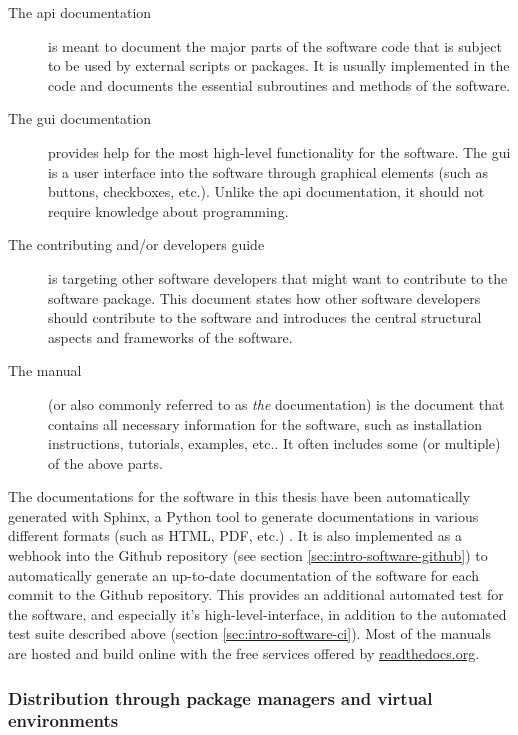 \begin{refsection}
\begin{description}
	\item[The \gls{api} documentation] is meant to document the major parts of the software code that is subject to be used by external scripts or packages. It is usually implemented in the code and documents the essential subroutines and methods of the software.
	\item[The \gls{gui} documentation] provides help for the most high-level functionality for the software. The \gls{gui} is a user interface into the software through graphical elements (such as buttons, checkboxes, etc.). Unlike the \gls{api} documentation, it should not require knowledge about programming.
	\item[The contributing and/or developers guide] is targeting other software developers that might want to contribute to the software package. This document states how other software developers should contribute to the software and introduces the central structural aspects and frameworks of the software.
	\item[The manual] (or also commonly referred to as \textit{the} documentation) is the document that contains all necessary information for the software, such as installation instructions, tutorials, examples, etc.. It often includes some (or multiple) of the above parts.
\end{description}

The documentations for the software in this thesis have been automatically generated with Sphinx, a Python tool to generate documentations in various different formats (such as HTML, PDF, etc.)  \citep{PerezGrangerHunter2011, Hasecke2019}. It is also implemented as a webhook into the Github repository (see section \ref{sec:intro-software-github}) to automatically generate an up-to-date documentation of the software for each commit to the Github repository. This provides an additional automated test for the software, and especially it's high-level-interface, in addition to the automated test suite described above (section \ref{sec:intro-software-ci}). Most of the manuals are hosted and build online with the free services offered by \href{https://readthedocs.org/}{readthedocs.org}.


\subsubsection{Distribution through package managers and virtual environments} \label{sec:intro-software-conda}


\end{refsection}
